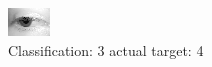 \begin{figure}[h!]
\begin{center}
\includegraphics[width=0.60\columnwidth]{figures/ID2565_class_3_target_4.png}
\end{center}
\caption{ Classification: 3 actual target: 4}
\label{fig:ID2565_class_3_target_4}
\end{figure}
